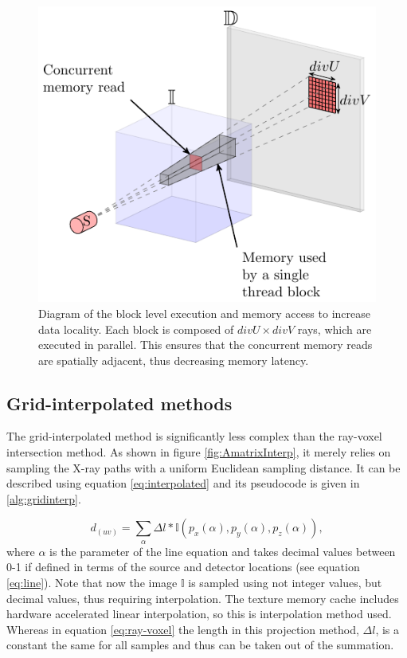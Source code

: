 \begin{figure}
\begin{center}

\includegraphics{GPUmethods/threadblocks-figure0.pdf} 
\end{center}

\caption[Diagram of trheadblock optimized kernel execution]{\label{fig:block} Diagram of the block level execution and memory access to increase data locality. Each block is composed of $divU\times divV$ rays, which are executed in parallel. This ensures that the concurrent memory reads are spatially adjacent, thus decreasing memory latency.} 
\end{figure}




\subsection{Grid-interpolated methods}

The grid-interpolated method is significantly less complex than the ray-voxel intersection method. As shown in figure \ref{fig:AmatrixInterp}, it merely relies on sampling the X-ray paths with a uniform Euclidean sampling distance. It can be described using equation \ref{eq:interpolated} and its pseudocode is given in \ref{alg:gridinterp}.

\begin{equation}
d_{(uv)}= \sum_{\alpha}\Delta l*\mathbb{I}(p_x(\alpha),p_y(\alpha),p_z(\alpha)),
\label{eq:interpolated}
\end{equation}
where $\alpha$ is the parameter of the line equation and takes decimal values between 0-1 if defined in terms of the source and detector locations (see equation \ref{eq:line}). Note that now the image $\mathbb{I}$ is sampled using not integer values, but decimal values, thus requiring interpolation. The texture memory cache includes hardware accelerated linear interpolation, so this is interpolation method used. Whereas in equation \ref{eq:ray-voxel} the length in this projection method, $\Delta l$, is a constant the same for all samples and thus can be taken out of the summation.

